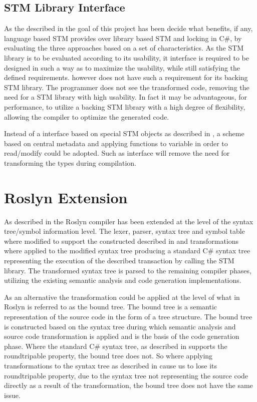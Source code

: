 \subsection{STM Library Interface}
As the described in  the goal of this project has been decide what benefits, if any, language based \ac{STM} provides over library based \ac{STM} and locking in C\#, by evaluating the three approaches based on a set of characteristics. As the \ac{STM} library is to be evaluated according to its usability, it interface is required to be designed in such a way as to maximize the usability, while still satisfying the defined requirements. \stmname however does not have such a requirement for its backing \ac{STM} library. The programmer does not see the transformed code, removing the need for a \ac{STM} library with high usability. In fact it may be advantageous, for performance, to utilize a backing \ac{STM} library with a high degree of flexibility, allowing the compiler to optimize the generated code. 

Instead of a interface based on special \ac{STM} objects as described in , a scheme based on central metadata and applying functions to variable in order to read/modify could be adopted. Such as interface will remove the need for transforming the types during compilation.

\section{Roslyn Extension}
As described in  the Roslyn compiler has been extended at the level of the syntax tree/symbol information level. The lexer, parser, syntax tree and symbol table where modified to support the constructed described in  and transformations where applied to the modified syntax tree producing a standard C\# syntax tree representing the execution of the described transaction by calling the \ac{STM} library. The transformed syntax tree is parsed to the remaining compiler phases, utilizing the existing semantic analysis and code generation implementations. 

As an alternative the transformation could be applied at the level of what in Roslyn is referred to as the bound tree. The bound tree is a semantic representation of the source code in the form of a tree structure. The bound tree is constructed based on the syntax tree during which semantic analysis and source code transformation is applied and is the basis of the code generation phase. Where the standard C\# syntax tree, as described in  supports the roundtripable property, the bound tree does not. So where applying transformations to the syntax tree as described in  cause us to lose its roundtripable property, due to the syntax tree not representing the source code directly as a result of the transformation, the bound tree does not have the same issue.

